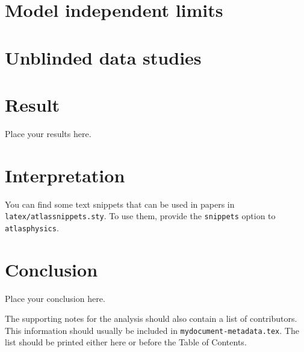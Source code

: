 \documentclass[NOTE, atlasdraft=true, texlive=2016, UKenglish]{atlasdoc}
\begin{document}
\clearpage 
\section{Model independent limits}
\label{sec:Scrambling_generic_limits}
%

\clearpage
\section{Unblinded data studies} %
\label{lab:UnblindedDataStudy}
%

\clearpage
\section{Result}
\label{sec:result}
Place your results here.


\clearpage
\section{Interpretation}
\label{sec:interpretation}
You can find some text snippets that can be used in papers in \texttt{latex/atlassnippets.sty}.
To use them, provide the \texttt{snippets} option to \texttt{atlasphysics}.

\clearpage
\section{Conclusion}
\label{sec:conclusion}
Place your conclusion here.



 \printbibliography
% 
% 

\clearpage
The supporting notes for the analysis should also contain a list of contributors.
This information should usually be included in \texttt{mydocument-metadata.tex}.
The list should be printed either here or before the Table of Contents.
\end{document}
